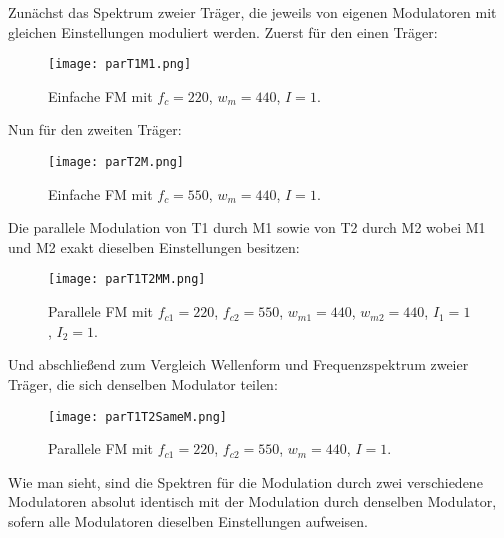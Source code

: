 Zunächst das Spektrum zweier Träger, die jeweils von eigenen Modulatoren mit gleichen Einstellungen moduliert werden. Zuerst für den einen Träger:
\FloatBarrier
\begin{figure} [ht]
\centering
  \texttt{[image: parT1M1.png]}
\caption{Einfache FM mit $f_c = 220$, $w_m = 440$, $I = 1$. }
\end{figure}
\FloatBarrier
Nun für den zweiten Träger:
\FloatBarrier
\begin{figure} [ht]
\centering
  \texttt{[image: parT2M.png]}
\caption{Einfache FM mit $f_c = 550$, $w_m = 440$, $I = 1$. }
\end{figure}
\FloatBarrier
Die parallele Modulation von T1 durch M1 sowie von T2 durch M2 wobei M1 und M2 exakt dieselben Einstellungen besitzen:
\FloatBarrier
\begin{figure} [ht]
\centering
  \texttt{[image: parT1T2MM.png]}
\caption{Parallele FM mit $f_{c1} = 220$, $f_{c2} = 550$, $w_{m1} = 440$, $w_{m2} = 440$, $I_1 = 1$, $I_2 = 1$. }
\end{figure}
\FloatBarrier
Und abschließend zum Vergleich Wellenform und Frequenzspektrum zweier Träger, die sich denselben Modulator teilen:
\FloatBarrier
\begin{figure} [ht]
\centering
  \texttt{[image: parT1T2SameM.png]}
\caption{Parallele FM mit $f_{c1} = 220$, $f_{c2} = 550$, $w_{m} = 440$, $I = 1$.  }
\end{figure}
\FloatBarrier
Wie man sieht, sind die Spektren für die Modulation durch zwei verschiedene Modulatoren absolut identisch mit der Modulation durch denselben Modulator, sofern alle Modulatoren dieselben Einstellungen aufweisen.

